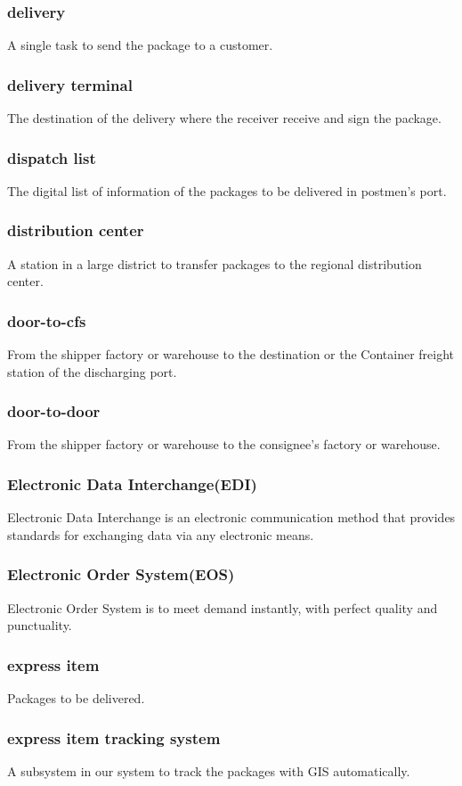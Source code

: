 \documentclass[12pt]{scrreprt}
\begin{document}
\begin{spacing}{0.7}
\subsubsection{delivery}
A single task to send the package to a customer.
\subsubsection{delivery terminal}
The destination of the delivery where the receiver receive and sign the package.
\subsubsection{dispatch list}
The digital list of information of the packages to be delivered in postmen’s port.
\subsubsection{distribution center}
A station in a large district to transfer packages to the regional distribution center.
\subsubsection{door-to-cfs}
From the shipper factory or warehouse to the destination or the Container freight station of the discharging port.
\subsubsection{door-to-door}
From the shipper factory or warehouse to the consignee's factory
or warehouse.
\subsubsection{Electronic Data Interchange(EDI)}
Electronic Data Interchange is an electronic communication method that provides standards for exchanging data via any electronic means.
\subsubsection{Electronic Order System(EOS)}
Electronic Order System is to meet demand instantly, with perfect quality and punctuality.
\subsubsection{express item}
Packages to be delivered.
\subsubsection{express item tracking system}
A subsystem in our system to track the packages with GIS automatically.

\end{spacing}
\end{document}
